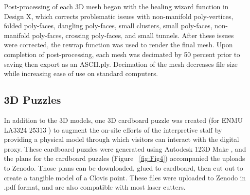 \documentclass[preprint,12pt]{elsarticle}
\begin{document}
Post-processing of each 3D mesh began with the healing wizard function in Design X, which corrects problematic issues with non-manifold poly-vertices, folded poly-faces, dangling poly-faces, small clusters, small poly-faces, non-manifold poly-faces, crossing poly-faces, and small tunnels. After these issues were corrected, the rewrap function was used to render the final mesh. Upon completion of post-processing, each mesh was decimated by 50 percent prior to saving then export as an ASCII.ply. Decimation of the mesh decreases file size while increasing ease of use on standard computers.

\subsection{3D Puzzles}

In addition to the 3D models, one 3D cardboard puzzle was created (for ENMU LA3324 25313 \cite{Selden:Z}) to augment the on-site efforts of the interpretive staff by providing a physical model through which visitors can interact with the digital proxy. These cardboard puzzles were generated using Autodesk 123D Make \cite{Autodesk:1}, and the plans for the cardboard puzzles (Figure ~\ref{fig:Fig4}) accompanied the uploads to Zenodo. Those plans can be downloaded, glued to cardboard, then cut out to create a tangible model of a Clovis point. These files were uploaded to Zenodo in .pdf format, and are also compatible with most laser cutters.
\end{document}
